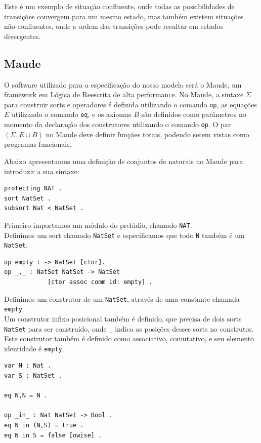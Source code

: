 Este é um exemplo de situação confluente, onde todas as possibilidades de transições convergem para um mesmo estado, mas também existem situações não-confluentes, onde a ordem das transições pode resultar em estados divergentes.

\subsection{Maude} \label{sec:chap2sub1}

O software utilizado para a especificação do nosso modelo será o Maude, um framework em Lógica de Reescrita de alta performance.
No Maude, a sintaxe $\Sigma$ para construir sorts e operadores é definida utilizando o comando \texttt{op}, as equações $E$ utilizando o comando \texttt{eq}, e os axiomas $B$ são definidos como parâmetros no momento da declaração dos construtores utilizando o comando \texttt{op}.
O par $(\Sigma, E \cup B)$ no Maude deve definir funções totais, podendo serem vistas como programas funcionais.

Abaixo apresentamos uma definição de conjuntos de naturais no Maude para introduzir a sua sintaxe:

\begin{verbatim}
protecting NAT .
sort NatSet .
subsort Nat < NatSet .
\end{verbatim}

\noindent
Primeiro importamos um módulo do prelúdio, chamado \texttt{NAT}. \\
Definimos um sort chamado \texttt{NatSet} e especificamos que todo \texttt{N} também é um \texttt{NatSet}.

\begin{verbatim}
op empty : -> NatSet [ctor].
op _,_ : NatSet NatSet -> NatSet 
            [ctor assoc comm id: empty] .
\end{verbatim}

\noindent
Definimos um construtor de um \texttt{NatSet}, através de uma constante chamada \texttt{empty}. \\
Um construtor infixo posicional também é definido, que precisa de dois sorts \texttt{NatSet} para ser construído, onde \texttt{\_} indica as posições desses sorts no construtor. Este construtor também é definido como associativo, comutativo, e seu elemento identidade é \texttt{empty}.

\begin{verbatim}
var N : Nat .
var S : NatSet .

eq N,N = N .

op _in_ : Nat NatSet -> Bool .
eq N in (N,S) = true .
eq N in S = false [owise] .
\end{verbatim}

